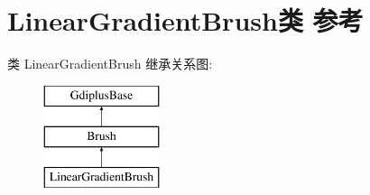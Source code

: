 \hypertarget{class_linear_gradient_brush}{}\section{Linear\+Gradient\+Brush类 参考}
\label{class_linear_gradient_brush}
类 Linear\+Gradient\+Brush 继承关系图\+:\begin{figure}[H]
\begin{center}
\leavevmode
\includegraphics[height=3.000000cm]{class_linear_gradient_brush}
\end{center}
\end{figure}

